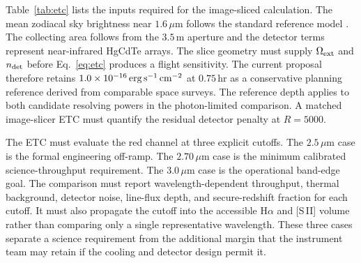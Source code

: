 Table~\ref{tab:etc} lists the inputs required for the image-sliced calculation. The mean zodiacal sky brightness near $1.6\,\mu$m follows the standard reference model \cite{leinert1998}. The collecting area follows from the $3.5$\,m aperture and the detector terms represent near-infrared HgCdTe arrays. The slice geometry must supply $\Omega_{\rm ext}$ and $n_{\rm det}$ before Eq.~\eqref{eq:etc} produces a flight sensitivity. The current proposal therefore retains $1.0\times10^{-16}\,{\rm erg\,s^{-1}\,cm^{-2}}$ at $0.75$\,hr as a conservative planning reference derived from comparable space surveys. The reference depth applies to both candidate resolving powers in the photon-limited comparison. A matched image-slicer ETC must quantify the residual detector penalty at $R=5000$.

The ETC must evaluate the red channel at three explicit cutoffs. The $2.5\,\mu$m case is the formal engineering off-ramp. The $2.70\,\mu$m case is the minimum calibrated science-throughput requirement. The $3.0\,\mu$m case is the operational band-edge goal. The comparison must report wavelength-dependent throughput, thermal background, detector noise, line-flux depth, and secure-redshift fraction for each cutoff. It must also propagate the cutoff into the accessible H$\alpha$ and [S\,II] volume rather than comparing only a single representative wavelength. These three cases separate a science requirement from the additional margin that the instrument team may retain if the cooling and detector design permit it.

